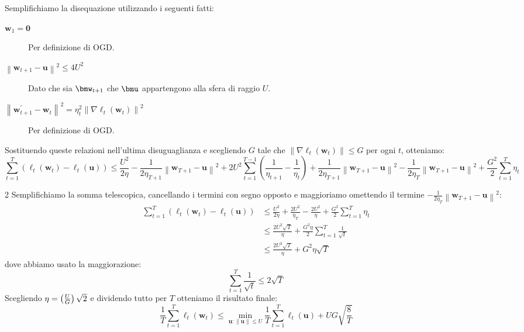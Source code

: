 \documentclass[\main/main.tex]{subfiles}
\begin{document}
\begin{analysis}
\[    \]
    Semplifichiamo la disequazione utilizzando i seguenti fatti:
    \begin{description}
        \item[\(\boldsymbol{w}_{1}=\mathbf{0}\)] Per definizione di OGD.
        \item[\(\left\|\boldsymbol{w}_{t+1}-\boldsymbol{u}\right\|^{2} \leq 4 U^{2}\)] Dato che sia \(\bmw_{t+1}\) che \(\bmu\) appartengono alla sfera di raggio \(U\).
        \item[\(\left\|\boldsymbol{w}_{t+1}^{\prime}-\boldsymbol{w}_{t}\right\|^{2}=\eta_{t}^{2}\left\|\nabla \ell_{t}\left(\boldsymbol{w}_{t}\right)\right\|^{2}\)] Per definizione di OGD.
    \end{description}
    Sostituendo queste relazioni nell'ultima disuguaglianza e scegliendo \(G\) tale che \(\left\|\nabla \ell_{t}\left(\boldsymbol{w}_{t}\right)\right\| \leq G\) per ogni \(t\), otteniamo:
    \[
        \sum_{t=1}^{T}\left(\ell_{t}\left(\boldsymbol{w}_{t}\right)-\ell_{t}(\boldsymbol{u})\right) \leq \frac{U^{2}}{2 \eta}-\frac{1}{2 \eta_{T+1}}\left\|\boldsymbol{w}_{T+1}-\boldsymbol{u}\right\|^{2} +2 U^{2} \sum_{t=1}^{T-1}\left(\frac{1}{\eta_{t+1}}-\frac{1}{\eta_{t}}\right)+\frac{1}{2 \eta_{T+1}}\left\|\boldsymbol{w}_{T+1}-\boldsymbol{u}\right\|^{2}-\frac{1}{2 \eta_{T}}\left\|\boldsymbol{w}_{T+1}-\boldsymbol{u}\right\|^{2}+\frac{G^{2}}{2} \sum_{t=1}^{T} \eta_{t}
    \]
    \vspace{0.5em}
    \begin{multicols}{2}
        Semplifichiamo la somma telescopica, cancellando i termini con segno opposto e maggioriamo omettendo il termine \(-\frac{1}{2 \eta_{T}}\left\|\boldsymbol{w}_{T+1}-\boldsymbol{u}\right\|^{2}\):
        \begin{align*} \sum_{t=1}^{T}\left(\ell_{t}\left(\boldsymbol{w}_{t}\right)-\ell_{t}(\boldsymbol{u})\right) & \leq \frac{U^{2}}{2 \eta}+\frac{2 U^{2}}{\eta_{T}}-\frac{2 U^{2}}{\eta}+\frac{G^{2}}{2} \sum_{t=1}^{T} \eta_{t}\\&\leq \frac{2 U^{2} \sqrt{T}}{\eta}+\frac{G^{2} \eta}{2} \sum_{t=1}^{T} \frac{1}{\sqrt{t}} \\ & \leq \frac{2 U^{2} \sqrt{T}}{\eta}+G^{2} \eta \sqrt{T} \end{align*}
        dove abbiamo usato la maggiorazione:
        \[\sum_{t=1}^{T} \frac{1}{\sqrt{t}} \leq 2 \sqrt{T}\]
        Scegliendo \(\eta = \left(\frac{U}{G}\right)\sqrt{2}\) e dividendo tutto per \(T\) otteniamo il risultato finale:
        \[\frac{1}{T} \sum_{t=1}^{T} \ell_{t}\left(\boldsymbol{w}_{t}\right) \leq \min _{\boldsymbol{u} :\|\boldsymbol{u}\| \leq U} \frac{1}{T} \sum_{t=1}^{T} \ell_{t}(\boldsymbol{u})+U G \sqrt{\frac{8}{T}}\]
    \end{multicols}
\end{analysis}
\end{document}
